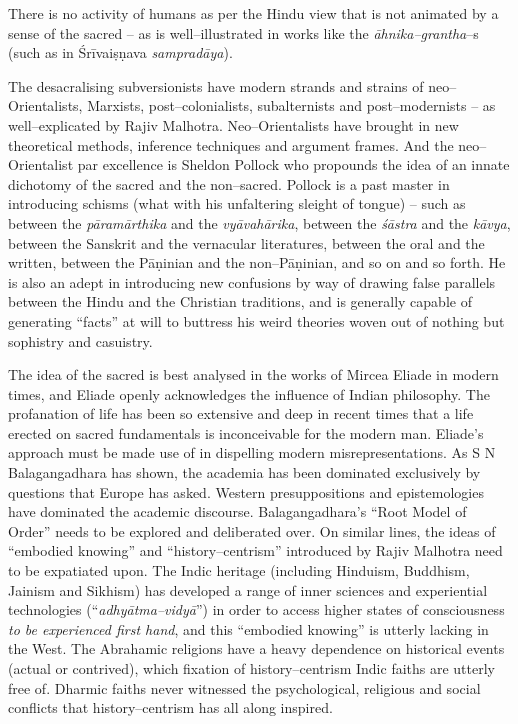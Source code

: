 There is no activity of humans as per the Hindu view that is not animated by a sense of the sacred – as is well–illustrated in works like the \textit{āhnika–grantha}–s (such as in Śrīvaiṣṇava \textit{sampradāya}).

The desacralising subversionists have modern strands and strains of neo–Orientalists, Marxists, post–colonialists, subalternists and post–modernists – as well–explicated by Rajiv Malhotra. Neo–Orientalists have brought in new theoretical methods, inference techniques and argument frames. And the neo–Orientalist par excellence is Sheldon Pollock who propounds the idea of an innate dichotomy of the sacred and the non–sacred. Pollock is a past master in introducing schisms (what with his unfaltering sleight of tongue) – such as between the \textit{pāramārthika} and the \textit{vyāvahārika}, between the \textit{śāstra} and the \textit{kāvya}, between the Sanskrit and the vernacular literatures, between the oral and the written, between the Pāṇinian and the non–Pāṇinian, and so on and so forth. He is also an adept in introducing new confusions by way of drawing false parallels between the Hindu and the Christian traditions, and is generally capable of generating “facts” at will to buttress his weird theories woven out of nothing but sophistry and casuistry.

The idea of the sacred is best analysed in the works of Mircea Eliade in modern times, and Eliade openly acknowledges the influence of Indian philosophy. The profanation of life has been so extensive and deep in recent times that a life erected on sacred fundamentals is inconceivable for the modern man. Eliade’s approach must be made use of in dispelling modern misrepresentations. As S N Balagangadhara has shown, the academia has been dominated exclusively by questions that Europe has asked. Western presuppositions and epistemologies have dominated the academic discourse. Balagangadhara’s “Root Model of Order” needs to be explored and deliberated over. On similar lines, the ideas of “embodied knowing” and “history–centrism” introduced by Rajiv Malhotra need to be expatiated upon. The Indic heritage (including Hinduism, Buddhism, Jainism and Sikhism) has developed a range of inner sciences and experiential technologies (“\textit{adhyātma–vidyā}”) in order to access higher states of consciousness \textit{to be experienced first hand}, and this “embodied knowing” is utterly lacking in the West. The Abrahamic religions have a heavy dependence on historical events (actual or contrived), which fixation of history–centrism Indic faiths are utterly free of. Dharmic faiths never witnessed the psychological, religious and social conflicts that history–centrism has all along inspired.

